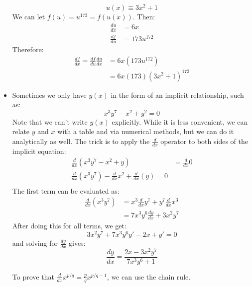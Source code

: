 \begin{itemize}
\begin{example}
        \begin{equation}
            u(x) \equiv 3x^2+1
            \label{eq:}
        \end{equation}
        We can let $f(u)=u^{173}=f(u(x))$. Then:
        \begin{align}
            \frac{du}{dx} &= 6x \\ 
            \frac{df}{du} &= 173u^{172}
            \label{eq:}
        \end{align}
        Therefore:
        \begin{align}
            \frac{df}{dx}=\frac{df}{du}\frac{du}{dx} &= 6x(173u^{172}) \\ 
            &= 6x(173)(3x^2+1)^{172}
        \end{align}
    \end{example}
    \item Sometimes we only have $y(x)$ in the form of an implicit relationship, such as:
    \begin{equation}
        x^3y^7-x^2+y^2=0
        \label{eq:}
    \end{equation}
    Note that we can't write $y(x)$ explicitly. While it is less convenient, we can relate $y$ and $x$ with a table and via numerical methods, but we can do it analytically as well. The trick is to apply the $\frac{d}{dx}$ operator to both sides of the implicit equation:
    \begin{align}
        \frac{d}{dx}\left(x^3y^7-x^2+y\right) &= \frac{d}{dx}0 \\ 
        \frac{d}{dx} (x^3y^7) - \frac{d}{dx} x^2 + \frac{d}{dx}(y) = 0 \\ 
        \label{eq:}
    \end{align}
    The first term can be evaluated as:
    \begin{align}
        \frac{d}{dx}(x^3y^7) &= x^3\frac{d}{dx}y^7 + y^7\frac{d}{dx}x^3 \\ 
        &= 7x^3y^6\frac{dy}{dx}+3x^2y^7
    \end{align}
    After doing this for all terms, we get:
    \begin{equation}
        3x^2y^7+7x^3y^6y'-2x+y' = 0        \label{eq:}
    \end{equation}
    and solving for $\frac{dy}{dx}$ gives:
    \begin{equation}
        \frac{dy}{dx} = \frac{2x-3x^2y^7}{7x^3y^6+1}
        \label{eq:}
    \end{equation}
    \begin{prooof}
        To prove that $\frac{d}{dx}x^{p/q} = \frac{p}{q}x^{p/q-1}$, we can use the chain rule.
        \vspace{2mm}


\end{prooof}
\end{itemize}
